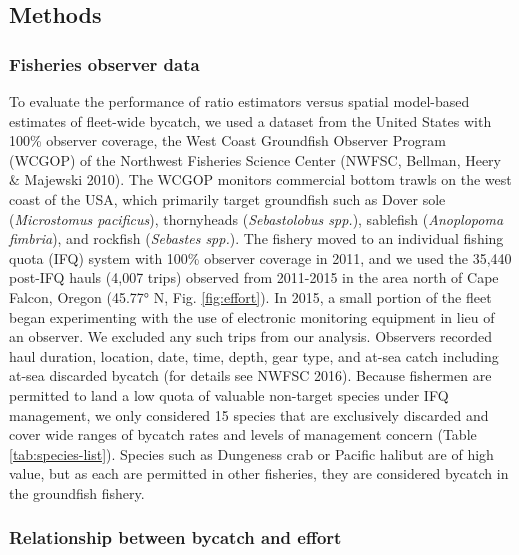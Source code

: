 \documentclass[]{article}
\begin{document}
\hypertarget{methods}{%
\subsection{Methods}\label{methods}}

\hypertarget{fisheries-observer-data}{%
\subsubsection{Fisheries observer data}\label{fisheries-observer-data}}

To evaluate the performance of ratio estimators versus spatial
model-based estimates of fleet-wide bycatch, we used a dataset from the
United States with 100\% observer coverage, the West Coast Groundfish
Observer Program (WCGOP) of the Northwest Fisheries Science Center
(NWFSC, Bellman, Heery \& Majewski 2010). The WCGOP monitors commercial
bottom trawls on the west coast of the USA, which primarily target
groundfish such as Dover sole (\emph{Microstomus pacificus}),
thornyheads (\emph{Sebastolobus spp.}), sablefish (\emph{Anoplopoma
fimbria}), and rockfish (\emph{Sebastes spp.}). The fishery moved to an
individual fishing quota (IFQ) system with 100\% observer coverage in
2011, and we used the 35,440 post-IFQ hauls (4,007 trips) observed from
2011-2015 in the area north of Cape Falcon, Oregon (45.77° N, Fig.
\ref{fig:effort}). In 2015, a small portion of the fleet began
experimenting with the use of electronic monitoring equipment in lieu of
an observer. We excluded any such trips from our analysis. Observers
recorded haul duration, location, date, time, depth, gear type, and
at-sea catch including at-sea discarded bycatch (for details see NWFSC
2016). Because fishermen are permitted to land a low quota of valuable
non-target species under IFQ management, we only considered 15 species
that are exclusively discarded and cover wide ranges of bycatch rates
and levels of management concern (Table \ref{tab:species-list}). Species
such as Dungeness crab or Pacific halibut are of high value, but as each
are permitted in other fisheries, they are considered bycatch in the
groundfish fishery.

\hypertarget{relationship-between-bycatch-and-effort}{%
\subsubsection{Relationship between bycatch and
effort}\label{relationship-between-bycatch-and-effort}}
\end{document}
